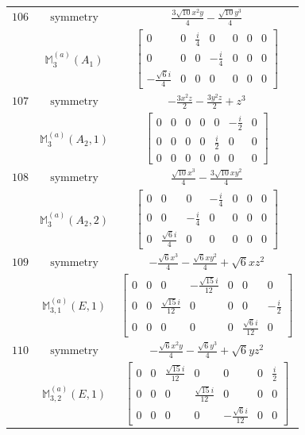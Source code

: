 \documentclass[fleqn,8pt,landscape]{jsarticle}
\begin{document}
\begin{longtable}{ccc}
$ 106 $ & $ \text{symmetry} $ & $ \frac{3 \sqrt{10} x^{2} y}{4} - \frac{\sqrt{10} y^{3}}{4} $ \\
$  $ & $ \mathbb{M}_{3}^{(a)}(A_{1}) $ & $ \begin{bmatrix} 0 & 0 & \frac{i}{4} & 0 & 0 & 0 & 0 \\ 0 & 0 & 0 & - \frac{i}{4} & 0 & 0 & 0 \\ - \frac{\sqrt{6} i}{4} & 0 & 0 & 0 & 0 & 0 & 0 \end{bmatrix} $ \\ \hline
$ 107 $ & $ \text{symmetry} $ & $ - \frac{3 x^{2} z}{2} - \frac{3 y^{2} z}{2} + z^{3} $ \\
$  $ & $ \mathbb{M}_{3}^{(a)}(A_{2},1) $ & $ \begin{bmatrix} 0 & 0 & 0 & 0 & 0 & - \frac{i}{2} & 0 \\ 0 & 0 & 0 & 0 & \frac{i}{2} & 0 & 0 \\ 0 & 0 & 0 & 0 & 0 & 0 & 0 \end{bmatrix} $ \\ \hline
$ 108 $ & $ \text{symmetry} $ & $ \frac{\sqrt{10} x^{3}}{4} - \frac{3 \sqrt{10} x y^{2}}{4} $ \\
$  $ & $ \mathbb{M}_{3}^{(a)}(A_{2},2) $ & $ \begin{bmatrix} 0 & 0 & 0 & - \frac{i}{4} & 0 & 0 & 0 \\ 0 & 0 & - \frac{i}{4} & 0 & 0 & 0 & 0 \\ 0 & \frac{\sqrt{6} i}{4} & 0 & 0 & 0 & 0 & 0 \end{bmatrix} $ \\ \hline
$ 109 $ & $ \text{symmetry} $ & $ - \frac{\sqrt{6} x^{3}}{4} - \frac{\sqrt{6} x y^{2}}{4} + \sqrt{6} x z^{2} $ \\
$  $ & $ \mathbb{M}_{3,1}^{(a)}(E,1) $ & $ \begin{bmatrix} 0 & 0 & 0 & - \frac{\sqrt{15} i}{12} & 0 & 0 & 0 \\ 0 & 0 & \frac{\sqrt{15} i}{12} & 0 & 0 & 0 & - \frac{i}{2} \\ 0 & 0 & 0 & 0 & 0 & \frac{\sqrt{6} i}{12} & 0 \end{bmatrix} $ \\ \hline
$ 110 $ & $ \text{symmetry} $ & $ - \frac{\sqrt{6} x^{2} y}{4} - \frac{\sqrt{6} y^{3}}{4} + \sqrt{6} y z^{2} $ \\
$  $ & $ \mathbb{M}_{3,2}^{(a)}(E,1) $ & $ \begin{bmatrix} 0 & 0 & \frac{\sqrt{15} i}{12} & 0 & 0 & 0 & \frac{i}{2} \\ 0 & 0 & 0 & \frac{\sqrt{15} i}{12} & 0 & 0 & 0 \\ 0 & 0 & 0 & 0 & - \frac{\sqrt{6} i}{12} & 0 & 0 \end{bmatrix} $ \\ \hline

\end{longtable}
\end{document}
